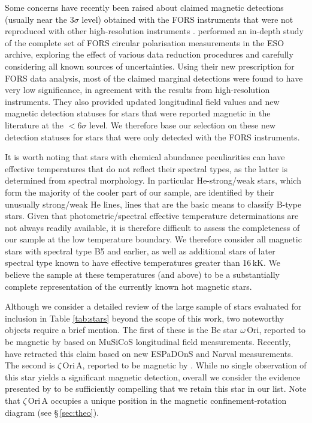 \documentclass[useAMS,usenatbib]{mn2e}
\begin{document}
Some concerns have recently been raised about claimed magnetic detections (usually near the $3\sigma$ level) obtained with the FORS instruments that were not reproduced with other high-resolution instruments \citep[see][]{2009MNRAS.398.1505S,2012ApJ...750....2S}. \citet{2012A&A...538A.129B} performed an in-depth study of the complete set of FORS circular polarisation measurements in the ESO archive, exploring the effect of various data reduction procedures and carefully considering all known sources of uncertainties. Using their new prescription for FORS data analysis, most of the claimed marginal detections were found to have very low significance, in agreement with the results from high-resolution instruments. They also provided updated longitudinal field values and new magnetic detection statuses for stars that were reported magnetic in the literature at the $<6\sigma$ level. We therefore base our selection on these new detection statuses for stars that were only detected with the FORS instruments. 

It is worth noting that stars with chemical abundance peculiarities can have effective temperatures that do not reflect their spectral types, as the latter is determined from spectral morphology. 
In particular He-strong/weak stars, which form the majority of the cooler part of our sample, are identified by their unusually strong/weak He lines, lines that are the basic means to classify B-type stars.
Given that photometric/spectral effective temperature determinations are not always readily available, it is therefore difficult to assess the completeness of our sample at the low temperature boundary. 
We therefore consider all magnetic stars with spectral type B5 and earlier, as well as additional stars of later spectral type known to have effective temperatures greater than 16\,kK. We believe the sample at these temperatures (and above) to be a substantially complete representation of the currently known hot magnetic stars.

Although we consider a detailed review of the large sample of stars evaluated for inclusion in Table \ref{tab:stars} beyond the scope of this work, two noteworthy objects require a brief mention. The first of these is the Be star $\omega$\,Ori, reported to be magnetic by \citet{2003A&A...409..275N} based on MuSiCoS longitudinal field measurements. Recently, \citet{neiner_omegaori} have retracted this claim based on new ESPaDOnS and Narval measurements. The second is $\zeta$\,Ori\,A, reported to be magnetic by \citet{2008MNRAS.389...75B}. While no single observation of this star yields a significant magnetic detection, overall we consider the evidence presented by \citet{2008MNRAS.389...75B} to be sufficiently compelling that we retain this star in our list. Note that $\zeta$\,Ori\,A occupies a unique position in the magnetic confinement-rotation diagram (see \S\,\ref{sec:theo}).
\end{document}
